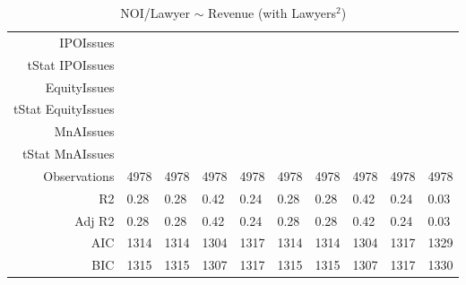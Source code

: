 \begin{table}[ht]
\begin{tabular}{rlllllllll}
  IPOIssues &  &  &  &  &  &  &  &  &  \\ 
  tStat IPOIssues &  &  &  &  &  &  &  &  &  \\ 
  EquityIssues &  &  &  &  &  &  &  &  &  \\ 
  tStat EquityIssues &  &  &  &  &  &  &  &  &  \\ 
  MnAIssues &  &  &  &  &  &  &  &  &  \\ 
  tStat MnAIssues &  &  &  &  &  &  &  &  &  \\ 
  Observations & 4978 & 4978 & 4978 & 4978 & 4978 & 4978 & 4978 & 4978 & 4978 \\ 
  R2 & 0.28 & 0.28 & 0.42 & 0.24 & 0.28 & 0.28 & 0.42 & 0.24 & 0.03 \\ 
  Adj R2 & 0.28 & 0.28 & 0.42 & 0.24 & 0.28 & 0.28 & 0.42 & 0.24 & 0.03 \\ 
  AIC & 1314 & 1314 & 1304 & 1317 & 1314 & 1314 & 1304 & 1317 & 1329 \\ 
  BIC & 1315 & 1315 & 1307 & 1317 & 1315 & 1315 & 1307 & 1317 & 1330 \\ 
   \hline
\end{tabular}
\caption{NOI/Lawyer $\sim$ Revenue (with Lawyers$^2$)} 
\end{table}
